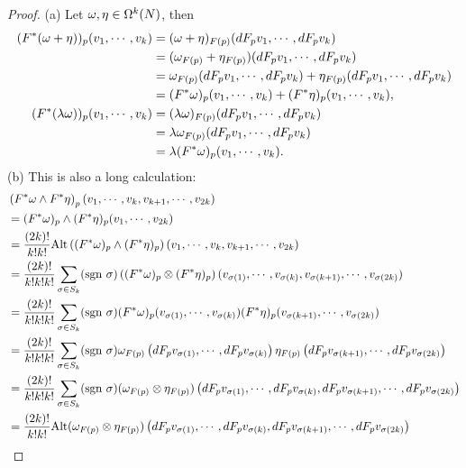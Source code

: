 \begin{proof}
    (a) Let $\omega, \eta \in \Omega^k(N)$, then 
    \begin{align*}
    (F^*(\omega+\eta))_p(v_1,\cdots,v_k) 
    &= (\omega+\eta)_{F(p)}(dF_p v_1,\cdots,dF_p v_k) \\
    &= (\omega_{F(p)} + \eta_{F(p)})(dF_p v_1, \cdots, dF_p v_k) \\
    &= \omega_{F(p)}(dF_p v_1, \cdots, dF_p v_k) + \eta_{F(p)}(dF_p v_1, \cdots, dF_p v_k) \\
    &= (F^*\omega)_p(v_1,\cdots,v_k) + (F^*\eta)_p(v_1,\cdots,v_k), \\
    (F^*(\lambda \omega))_p(v_1,\cdots,v_k)
    &= (\lambda \omega)_{F(p)}(dF_p v_1,\cdots,dF_p v_k) \\
    &= \lambda \omega_{F(p)}(dF_p v_1,\cdots,dF_p v_k) \\
    &= \lambda (F^* \omega)_p(v_1,\cdots,v_k).
    \end{align*}
    (b) This is also a long calculation:
    \begin{align*}
    &\br{F^*\omg \wedge F^*\eta}_p(v_1,\cdots, v_k, v_{k+1},\cdots,v_{2k}) \\
    &= (F^*\omg)_p \wedge (F^*\eta)_p (v_1,\cdots,v_{2k}) \\
    &= \frac{(2k)!}{k! k!}\Alt\br{(F^*\omg)_p \wedge (F^*\eta)_p}
       (v_1,\cdots, v_k, v_{k+1},\cdots,v_{2k}) \\
    &= \frac{(2k)!}{k!k!k!}\sum_{\sigma \in S_k}(\sgn \sigma)\br{(F^*\omg)_p \otimes (F^*\eta)_p}(v_{\sigma(1)},\cdots,v_{\sigma(k)},v_{\sigma(k+1)},\cdots,v_{\sigma(2k)}) \\
    &= \frac{(2k)!}{k!k!k!}\sum_{\sigma \in S_k}(\sgn \sigma)
       (F^*\omg)_p(v_{\sigma(1)},\cdots,v_{\sigma(k)}) 
       (F^*\eta)_p(v_{\sigma(k+1)},\cdots,v_{\sigma(2k)}) \\
    &= \frac{(2k)!}{k!k!k!}\sum_{\sigma \in S_k}(\sgn \sigma)
       \omg_{F(p)}\br{dF_p v_{\sigma(1)}, \cdots, dF_p v_{\sigma(k)}}
       \eta_{F(p)}\br{dF_p v_{\sigma(k+1)}, \cdots, dF_p v_{\sigma(2k)}} \\
    &= \frac{(2k)!}{k!k!k!}\sum_{\sigma \in S_k}(\sgn \sigma)
       (\omg_{F(p)} \otimes \eta_{F(p)}) \br{ 
       dF_p v_{\sigma(1)}, \cdots, dF_p v_{\sigma(k)}, dF_p v_{\sigma(k+1)}, \cdots, dF_p v_{\sigma(2k)} } \\
    &= \frac{(2k)!}{k!k!}\Alt(\omg_{F(p)} \otimes \eta_{F(p)})\br{
       dF_p v_{\sigma(1)}, \cdots, dF_p v_{\sigma(k)}, 
       dF_p v_{\sigma(k+1)}, \cdots, dF_p v_{\sigma(2k)} } \\

\end{align*}
\end{proof}
